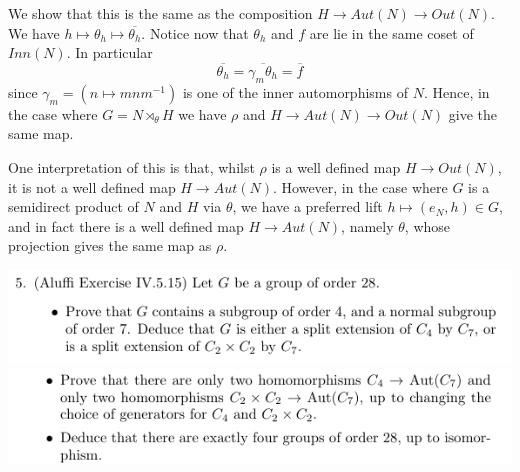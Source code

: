 \documentclass[12pt,letterpaper,boxed]{hmcpset}
\newcommand{\inv}{^{-1}}
\begin{document}
\begin{solution}
We show that this is the same as the composition $H \to Aut(N) \to
Out(N)$. We have $h \mapsto \theta_h \mapsto \overline{\theta_h}$. 
Notice now that $\theta_h$ and $f$ are lie in the same coset of
$Inn(N)$. In particular \[
	\overline{\theta_h} = \overline{\gamma_m \theta_h} = \overline{f}
\]
since $\gamma_m = (n \mapsto m n m\inv)$ is one of the inner
automorphisms of $N$.
Hence, in the case where $G = N \rtimes_\theta H$ we have $\rho$ and
$H \to Aut(N) \to Out(N)$ give the same map.

One interpretation of this is that, whilst $\rho$ is a well defined
map $H \to Out(N)$, it is not a well defined map $H \to Aut(N)$.
However, in the case where $G$ is a semidirect product of $N$ and $H$
via $\theta$,
we have a preferred lift $h \mapsto (e_N, h) \in G$, 
and in fact there is a well defined map $H \to Aut(N)$, namely
$\theta$, whose projection gives the same map as $\rho$. 


\end{solution}

\newpage

\begin{problem}
    \includegraphics[scale=0.8]{5-1.png}
	\includegraphics[scale=0.8]{5-2.png}
	\hfill
\end{problem}
\end{document}
